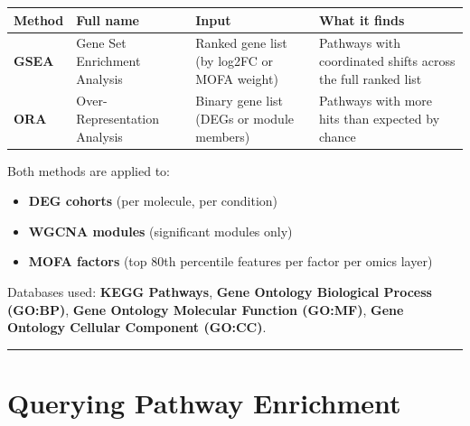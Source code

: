 \documentclass[
  letterpaper,
  oneside,
  open=any]{scrbook}
\newcounter{none} %
\providecommand{\tightlist}{%
  \setlength{\itemsep}{0pt}\setlength{\parskip}{0pt}}
\begin{document}
{\def\LTcaptype{none} %
\begin{longtable}[]{@{}
  >{\raggedright\arraybackslash}p{}
  >{\raggedright\arraybackslash}p{}
  >{\raggedright\arraybackslash}p{}
  >{\raggedright\arraybackslash}p{}@{}}
\toprule\noalign{}
\begin{minipage}[b]{\linewidth}\raggedright
Method
\end{minipage} & \begin{minipage}[b]{\linewidth}\raggedright
Full name
\end{minipage} & \begin{minipage}[b]{\linewidth}\raggedright
Input
\end{minipage} & \begin{minipage}[b]{\linewidth}\raggedright
What it finds
\end{minipage} \\
\midrule\noalign{}
\endhead
\bottomrule\noalign{}
\endlastfoot
\textbf{GSEA} & Gene Set Enrichment Analysis & Ranked gene list (by
log2FC or MOFA weight) & Pathways with coordinated shifts across the
full ranked list \\
\textbf{ORA} & Over-Representation Analysis & Binary gene list (DEGs or
module members) & Pathways with more hits than expected by chance \\
\end{longtable}
}

Both methods are applied to:

\begin{itemize}
\tightlist
\item
  \textbf{DEG cohorts} (per molecule, per condition)
\item
  \textbf{WGCNA modules} (significant modules only)
\item
  \textbf{MOFA factors} (top 80th percentile features per factor per
  omics layer)
\end{itemize}

Databases used: \textbf{KEGG Pathways}, \textbf{Gene Ontology Biological
Process (GO:BP)}, \textbf{Gene Ontology Molecular Function (GO:MF)},
\textbf{Gene Ontology Cellular Component (GO:CC)}.

\begin{center}\rule{0.5\linewidth}{0.5pt}\end{center}

\section{Querying Pathway Enrichment}\label{querying-pathway-enrichment}
\end{document}
